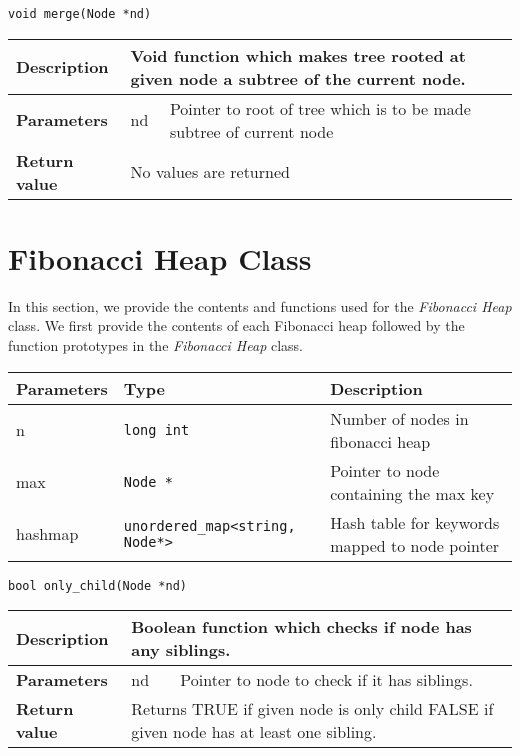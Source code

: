\documentclass[12pt, reqno]{amsart}
\begin{document}

{\large \texttt{void merge(Node *nd)}}
\begin{center}
    \begin{tabular}{| l | p{2.5cm} | p{9.5cm} |}
    \hline
    {\bfseries Description} & \multicolumn{2}{p{12.5cm}|}{Void function which makes tree rooted at given node a subtree of the current node.} \\ \hline
    \multirow{1}{*}{\bfseries Parameters} & nd & Pointer to root of tree which is to be made subtree of current node \\ \hline
    {\bfseries Return value} & \multicolumn{2}{p{12.5cm}|}{No values are returned} \\ \hline
    \end{tabular}
\end{center}

\newpage
\section*{Fibonacci Heap Class}
In this section, we provide the contents and functions used for the \emph{Fibonacci Heap} class. We first provide the contents of each Fibonacci heap followed by the function prototypes in the \emph{Fibonacci Heap} class.

\begin{center}
    \begin{tabular}{| l | l | p{6.8cm} |}
    \hline
    {\bfseries Parameters} & {\bfseries Type} & {\bfseries Description} \\ \hline
    n & \texttt{long int} & Number of nodes in fibonacci heap \\ \hline
    max & \texttt{Node *} & Pointer to node containing the max key \\ \hline
    hashmap & \texttt{unordered\_map<string, Node*>} & Hash table for keywords mapped to node pointer \\ \hline
    \end{tabular}
\end{center}
\vspace{5mm}


{\large \texttt{bool only\_child(Node *nd)}}
\begin{center}
    \begin{tabular}{| l | p{2.5cm} | p{9.5cm} |}
    \hline
    {\bfseries Description} & \multicolumn{2}{p{12.5cm}|}{Boolean function which checks if node has any siblings.} \\ \hline
    \multirow{1}{*}{\bfseries Parameters} & nd & Pointer to node to check if it has siblings. \\ \hline
    {\bfseries Return value} & \multicolumn{2}{p{12.5cm}|}{Returns TRUE if given node is only child FALSE if given node has at least one sibling.} \\ \hline
    \end{tabular}
\end{center} 
\vspace{3mm}   
\end{document}
